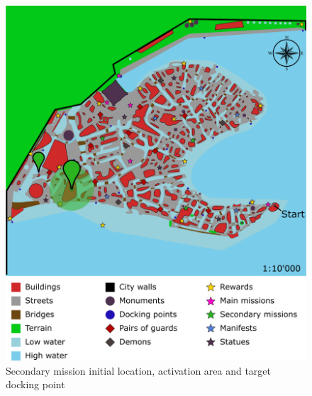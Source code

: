 \begin{figure}[H]
  \centering
  \includegraphics[width=\textwidth]{../Images/Maps/dynamiaSecondaryMissions_Councilman}
  \caption{Secondary mission initial location, activation area and target docking point}
\end{figure}

